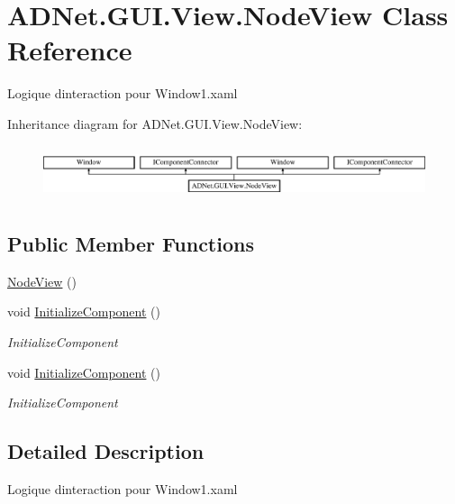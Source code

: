 \hypertarget{class_a_d_net_1_1_g_u_i_1_1_view_1_1_node_view}{}\section{A\+D\+Net.\+G\+U\+I.\+View.\+Node\+View Class Reference}
\label{class_a_d_net_1_1_g_u_i_1_1_view_1_1_node_view}


Logique d\textquotesingle{}interaction pour Window1.\+xaml  


Inheritance diagram for A\+D\+Net.\+G\+U\+I.\+View.\+Node\+View\+:\begin{figure}[H]
\begin{center}
\leavevmode
\includegraphics[height=1.600000cm]{class_a_d_net_1_1_g_u_i_1_1_view_1_1_node_view}
\end{center}
\end{figure}
\subsection*{Public Member Functions}
\begin{DoxyCompactItemize}
\item 
\hyperlink{class_a_d_net_1_1_g_u_i_1_1_view_1_1_node_view_a46eaac530d7263031ada6387f3ed71e1}{Node\+View} ()
\item 
void \hyperlink{class_a_d_net_1_1_g_u_i_1_1_view_1_1_node_view_a576ac61fb061727205551e77243e61e6}{Initialize\+Component} ()
\begin{DoxyCompactList}\small\item\em Initialize\+Component \end{DoxyCompactList}\item 
void \hyperlink{class_a_d_net_1_1_g_u_i_1_1_view_1_1_node_view_a576ac61fb061727205551e77243e61e6}{Initialize\+Component} ()
\begin{DoxyCompactList}\small\item\em Initialize\+Component \end{DoxyCompactList}\end{DoxyCompactItemize}


\subsection{Detailed Description}
Logique d\textquotesingle{}interaction pour Window1.\+xaml 

